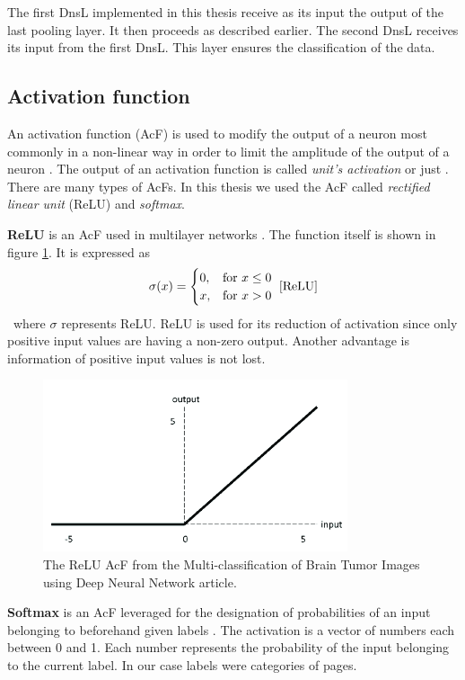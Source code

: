 The first DnsL implemented in this thesis receive as its input the output of the last pooling layer. It then proceeds as described earlier. The second DnsL receives its input from the first DnsL. This layer ensures the classification of the data.

\subsection{Activation function}\label{activationFunction}
An activation function (AcF) is used to modify the output of a neuron most commonly in a non-linear way in order to limit the amplitude of the output of a neuron \cite{activationFunction}. The output of an activation function is called \textit{unit's activation} or just . There are many types of AcFs. In this thesis we used the AcF called \textit{rectified linear unit} (ReLU) and \textit{softmax}.

\textbf{ReLU} is an AcF used in multilayer networks \cite{ReLU}. The function itself is shown in figure \ref{reluImage}. It is expressed as 
\[\sigma(x)= \begin{cases}
    0, & \text{for } x\leq 0\\
    x, & \text{for } x > 0
\end{cases}~\cite{ReLU}\] ~where $\sigma$ represents ReLU. ReLU is used for its reduction of activation since only positive input values are having a non-zero output. Another advantage is information of positive input values is not lost.
\begin{figure}[ht!]
  \centering
  \includegraphics[width=0.8\textwidth]{Images/ReLUFunction.png}
  \caption{The ReLU AcF from the Multi-classification of Brain Tumor Images using Deep Neural Network \cite{reluImage} article.} 
  \label{reluImage}
\end{figure} 

\textbf{Softmax} is an AcF leveraged for the designation of probabilities of an input belonging to beforehand given labels \cite{machineLeraningApproaches}. The activation is a vector of numbers each between 0 and 1. Each number represents the probability of the input belonging to the current label.  In our case labels were categories of pages.

